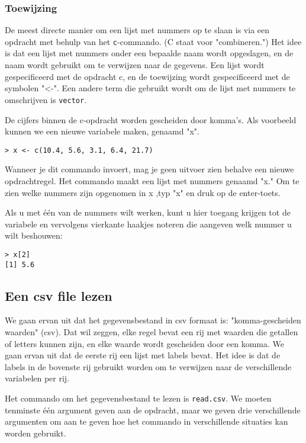 \subsubsection{Toewijzing}
De meest directe manier om een lijst met nummers op te slaan is via een opdracht met behulp van het \texttt{c}-commando. (C staat voor "combineren.") Het idee is dat een lijst met nummers onder een bepaalde naam wordt opgeslagen, en de naam wordt gebruikt om te verwijzen naar de gegevens. Een lijst wordt gespecificeerd met de opdracht c, en de toewijzing wordt gespecificeerd met de symbolen "<-". Een andere term die gebruikt wordt om de lijst met nummers te omschrijven is \texttt{vector}.

De cijfers binnen de c-opdracht worden gescheiden door komma's. Als voorbeeld kunnen we een nieuwe variabele maken, genaamd "x".

\begin{lstlisting}
> x <- c(10.4, 5.6, 3.1, 6.4, 21.7)
\end{lstlisting}
Wanneer je dit commando invoert, mag je geen uitvoer zien behalve een nieuwe opdrachtregel. Het commando maakt een lijst met nummers genaamd "x." Om te zien welke nummers zijn opgenomen in x ,typ "x" en druk op de enter-toets.

Als u met één van de nummers wilt werken, kunt u hier toegang krijgen tot de variabele en vervolgens vierkante haakjes noteren die aangeven welk nummer u wilt beshouwen:

\begin{lstlisting}
> x[2]
[1] 5.6
\end{lstlisting}

\subsection{Een csv file lezen}
We gaan ervan uit dat het gegevensbestand in csv formaat is: "komma-gescheiden waarden" (csv). Dat wil zeggen, elke regel bevat een rij met waarden die getallen of letters kunnen zijn, en elke waarde wordt gescheiden door een komma. We gaan ervan uit dat de eerste rij een lijst met labels bevat. Het idee is dat de labels in de bovenste rij gebruikt worden om te verwijzen naar de verschillende variabelen per rij.

Het commando om het gegevensbestand te lezen is \texttt{read.csv}. We moeten tenminste één argument geven aan de opdracht, maar we geven drie verschillende argumenten om aan te geven hoe het commando in verschillende situaties kan worden gebruikt. 

